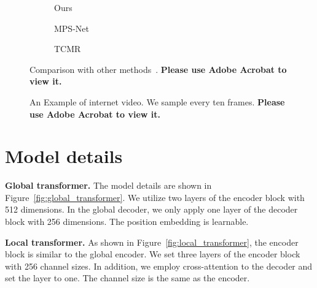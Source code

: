 \documentclass[10pt,twocolumn,letterpaper]{article}
\begin{document}
\begin{figure*}[!t]
    \centering
    \begin{subfigure}{0.32\linewidth}
        \caption{\small Ours}
        
    \end{subfigure}
    \begin{subfigure}{0.32\linewidth}
        \caption{\small MPS-Net~\cite{MPS-net}}
        
    \end{subfigure}
    \begin{subfigure}{0.32\linewidth}
        \caption{\small TCMR~\cite{TCMR}}
        
    \end{subfigure}
    \vspace{-0.5 em}
    \caption{Comparison with other methods~\cite{TCMR, MPS-net}. \textbf{Please use Adobe Acrobat to view it.}}
    \label{fig:more_1}
    \vspace{-0.5 em}
\end{figure*}

\begin{figure*}[!t]
    \centering
    \vspace{-0.5 em}
    \caption{An Example of internet video. We sample every ten frames. \textbf{Please use Adobe Acrobat to view it.}}
    \label{fig:more_2}
    \vspace{-0.5 em}
\end{figure*}

\section{Model details}
    \noindent\textbf{Global transformer.}
    The model details are shown in Figure~\ref{fig:global_transformer}. We utilize two layers of the encoder block with 512 dimensions. In the global decoder, we only apply one layer of the decoder block with 256 dimensions. The position embedding is learnable.
	


	
	\noindent\textbf{Local transformer.}
	As shown in Figure~\ref{fig:local_transformer}, the encoder block is similar to the global encoder. We set three layers of the encoder block with 256 channel sizes. In addition, we employ cross-attention to the decoder and set the layer to one. The channel size is the same as the encoder.
\end{document}
